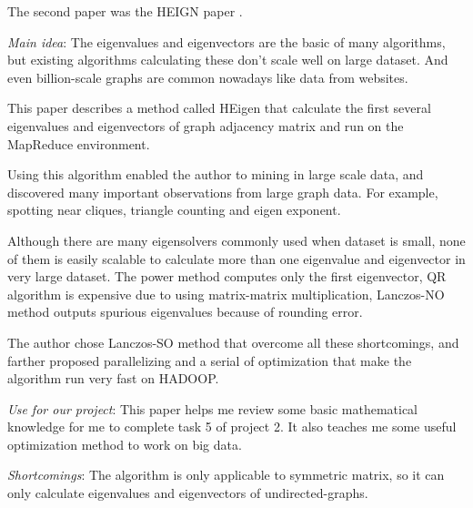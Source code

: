 The second paper was the HEIGN paper \cite{KangMF12}.
\begin{itemize*}
\item {\em Main idea}:
	   The eigenvalues and eigenvectors are the basic of many algorithms, but existing algorithms calculating these don’t scale well on large dataset. And even billion-scale graphs are common nowadays like data from websites.

	   This paper describes a method called HEigen that calculate the first several eigenvalues and eigenvectors of graph adjacency matrix and run on the MapReduce environment.

	   Using this algorithm enabled the author to mining in large scale data, and discovered many important observations from large graph data. For example, spotting near cliques, triangle counting and eigen exponent.

	   Although there are many eigensolvers commonly used when dataset is small, none of them is easily scalable to calculate more than one eigenvalue and eigenvector in very large dataset. The power method computes only the first eigenvector, QR algorithm is expensive due to using matrix-matrix multiplication, Lanczos-NO method outputs spurious eigenvalues because of rounding error.

	   The author chose Lanczos-SO method that overcome all these shortcomings, and farther proposed parallelizing and a serial of optimization that make the algorithm run very fast on HADOOP. 
\item {\em Use for our project}:
	   This paper helps me review some basic mathematical knowledge for me to complete task 5 of project 2. It also teaches me some useful optimization method to work on big data.
\item {\em Shortcomings}:
       The algorithm is only applicable to symmetric matrix, so it can only calculate eigenvalues and eigenvectors of undirected-graphs.
\end{itemize*}

